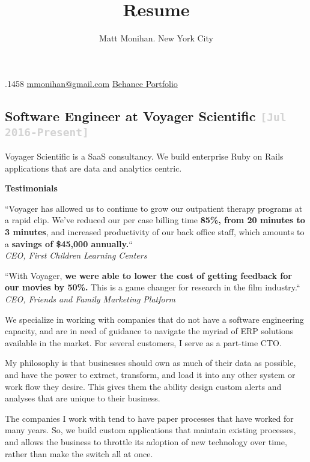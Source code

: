 \documentclass{tufte-handout}
\title{Resume}
\author{Matt Monihan. New York City}
\date{} %
\newcommand{\shstandout}[1]{\textbf{\textcolor{BurntOrange}{#1}}}
\newcommand{\shyears}[1]{\small{\texttt{\textcolor{LightGray}{#1}}}}
\begin{document}
.1458
\href{mailto:mmonihan@gmail.com}{mmonihan@gmail.com} \href{https://www.behance.net/mattmonihan}{Behance Portfolio}

\subsection{\textbf{Software Engineer} at \shstandout{Voyager Scientific} \shyears{[Jul 2016-Present]}}

Voyager Scientific is a SaaS consultancy. We build enterprise Ruby on Rails applications that are data and analytics centric.

\begin{marginfigure}%
\textbf{Testimonials}
\end{marginfigure}

\begin{marginfigure}%
``Voyager has allowed us to continue to grow our outpatient therapy programs at a rapid clip. We've reduced our per case billing time \textbf{85\%, from 20 minutes to 3 minutes}, and increased productivity of our back office staff, which amounts to a \textbf{savings of \$45,000 annually.}``
\\
\textit{CEO, First Children Learning Centers}
\end{marginfigure}

\begin{marginfigure}%
``With Voyager, \textbf{we were able to lower the cost of getting feedback for our movies by 50\%.} This is a game changer for research in the film industry.``
\\
\textit{CEO, Friends and Family Marketing Platform}
\end{marginfigure}
We specialize in working with companies that do not have a software engineering capacity, and are in need of guidance to navigate the myriad of ERP solutions available in the market. For several customers, I serve as a part-time CTO.


My philosophy is that businesses should own as much of their data as possible, and have the power to extract, transform, and load it into any other system or work flow they desire. This gives them the ability design custom alerts and analyses that are unique to their business.

The companies I work with tend to have paper processes that have worked for many years. So, we build custom applications that maintain existing processes, and allows the business to throttle its adoption of new technology over time, rather than make the switch all at once.
\end{document}
